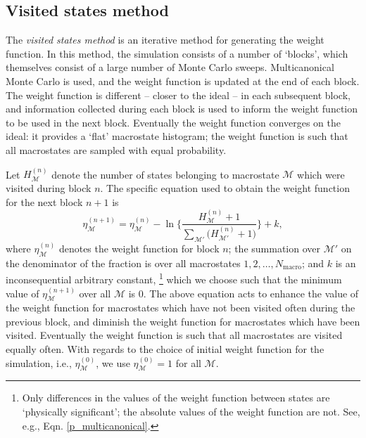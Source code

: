 \documentclass{report}
\begin{document}
\subsection{Visited states method}
The \emph{visited states method} is an iterative method for generating the weight function. In this method, the simulation consists of a number of
`blocks', which themselves consist of a large number of Monte Carlo sweeps. Multicanonical Monte Carlo is used, and the weight function is updated at
the end of each block. The weight function is different -- closer to the ideal -- in each subsequent block, and information
collected during each block is used to inform the weight function to be used in the next block. Eventually the weight function converges on the 
ideal: it provides a `flat' macrostate histogram; the weight function is such that all macrostates are sampled with equal probability.

Let $H^{(n)}_{\mathcal{M}}$ denote the number of states belonging to macrostate $\mathcal{M}$ which were visited during block $n$.
The specific equation used to obtain the weight function for the next block $n+1$ is
\begin{equation}
\eta^{(n+1)}_{\mathcal{M}}=\eta^{(n)}_{\mathcal{M}}-\ln\Biggl\lbrace
\frac{H^{(n)}_{\mathcal{M}}+1}{\sum_{\mathcal{M}'}\bigl(H^{(n)}_{\mathcal{M}'}+1\bigr)}
\Biggr\rbrace
+k,
\end{equation}
where $\eta^{(n)}_{\mathcal{M}}$ denotes the weight function for block $n$; the summation over $\mathcal{M}'$ on the denominator of the fraction is
over all macrostates $1,2,\dotsc,N_{\text{macro}}$; and $k$ is an inconsequential arbitrary constant,
\footnote{Only differences in the values of the weight function between states are `physically significant'; the absolute values 
of the weight function are not. See, e.g., Eqn. \eqref{p_multicanonical}.}
which we choose such that the minimum value of $\eta^{(n+1)}_{\mathcal{M}}$ over all $\mathcal{M}$ is 0.
The above equation acts to enhance the value of the weight function for macrostates which have not been visited often during the previous block, and
diminish the weight function for macrostates which have been visited. Eventually the weight function is such that all macrostates are visited equally
often. 
With regards to the choice of initial weight function for the simulation, i.e., $\eta^{(0)}_{\mathcal{M}}$, we use $\eta^{(0)}_{\mathcal{M}}=1$
for all $\mathcal{M}$.
\end{document}
